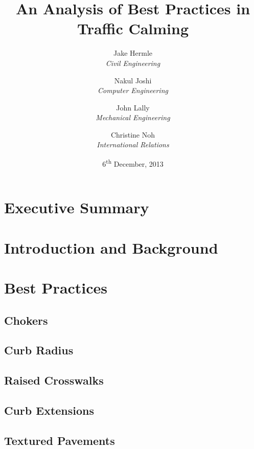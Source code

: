 \documentclass[titlepage,oneside]{article}
\title{An Analysis of Best Practices in Traffic Calming}
\author{
	Jake Hermle\\ \emph{Civil Engineering} \and
	Nakul Joshi\\ \emph{Computer Engineering} \and
	John Lally\\ \emph{Mechanical Engineering}\and
	Christine Noh\\ \emph{International Relations}
}
\date{6\textsuperscript{th} December, 2013}
\begin{document}
\listoftodos



\maketitle

\begin{abstract}

\end{abstract}

\tableofcontents
\newpage
\listoffigures
\newpage
\listoftables
\newpage

\section{Executive Summary}

\clearpage

\section{Introduction and Background}

\clearpage

\section{Best Practices}

	\subsection{Chokers}
	
	\clearpage

	\subsection{Curb Radius}
	
	\clearpage

	\subsection{Raised Crosswalks}
	
	\clearpage

	\subsection{Curb Extensions}
	
	\clearpage
	
	\subsection{Textured Pavements}
	
	\clearpage
	
\end{document}
